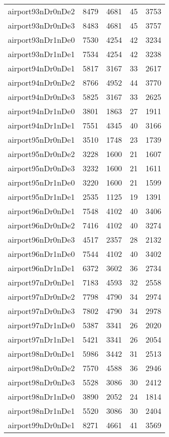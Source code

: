 \begin{longtable}{lrrrr}
airport93nDr0nDe2 & 8479 & 4681 & 45 & 3753 \\
airport93nDr0nDe3 & 8483 & 4681 & 45 & 3757 \\
airport93nDr1nDe0 & 7530 & 4254 & 42 & 3234 \\
airport93nDr1nDe1 & 7534 & 4254 & 42 & 3238 \\
airport94nDr0nDe1 & 5817 & 3167 & 33 & 2617 \\
airport94nDr0nDe2 & 8766 & 4952 & 44 & 3770 \\
airport94nDr0nDe3 & 5825 & 3167 & 33 & 2625 \\
airport94nDr1nDe0 & 3801 & 1863 & 27 & 1911 \\
airport94nDr1nDe1 & 7551 & 4345 & 40 & 3166 \\
airport95nDr0nDe1 & 3510 & 1748 & 23 & 1739 \\
airport95nDr0nDe2 & 3228 & 1600 & 21 & 1607 \\
airport95nDr0nDe3 & 3232 & 1600 & 21 & 1611 \\
airport95nDr1nDe0 & 3220 & 1600 & 21 & 1599 \\
airport95nDr1nDe1 & 2535 & 1125 & 19 & 1391 \\
airport96nDr0nDe1 & 7548 & 4102 & 40 & 3406 \\
airport96nDr0nDe2 & 7416 & 4102 & 40 & 3274 \\
airport96nDr0nDe3 & 4517 & 2357 & 28 & 2132 \\
airport96nDr1nDe0 & 7544 & 4102 & 40 & 3402 \\
airport96nDr1nDe1 & 6372 & 3602 & 36 & 2734 \\
airport97nDr0nDe1 & 7183 & 4593 & 32 & 2558 \\
airport97nDr0nDe2 & 7798 & 4790 & 34 & 2974 \\
airport97nDr0nDe3 & 7802 & 4790 & 34 & 2978 \\
airport97nDr1nDe0 & 5387 & 3341 & 26 & 2020 \\
airport97nDr1nDe1 & 5421 & 3341 & 26 & 2054 \\
airport98nDr0nDe1 & 5986 & 3442 & 31 & 2513 \\
airport98nDr0nDe2 & 7570 & 4588 & 36 & 2946 \\
airport98nDr0nDe3 & 5528 & 3086 & 30 & 2412 \\
airport98nDr1nDe0 & 3890 & 2052 & 24 & 1814 \\
airport98nDr1nDe1 & 5520 & 3086 & 30 & 2404 \\
airport99nDr0nDe1 & 8271 & 4661 & 41 & 3569 \\

\end{longtable}
